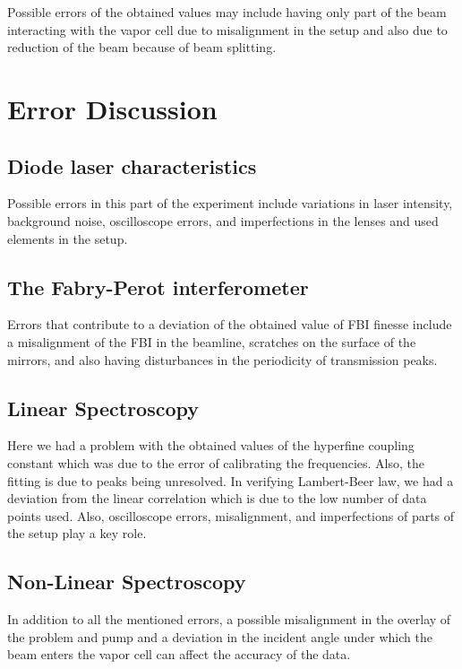 \documentclass[12pt]{article}
\begin{document}

Possible errors of the obtained values may include having only part of the beam interacting with the vapor cell due to misalignment in the setup and also due to reduction of the beam because of beam splitting.

\section{Error Discussion}

\subsection{Diode laser characteristics}
Possible errors in this part of the experiment include variations in laser intensity, background noise, oscilloscope errors, and imperfections in the lenses and used elements in the setup. 

\subsection{The Fabry-Perot interferometer}
Errors that contribute to a deviation of the obtained value of FBI finesse include a misalignment of the FBI in the beamline, scratches on the surface of the mirrors, and also having disturbances in the periodicity of transmission peaks. 

\subsection{Linear Spectroscopy}
Here we had a problem with the obtained values of the hyperfine coupling constant which was due to the error of calibrating the frequencies. Also, the fitting is due to peaks being unresolved. In verifying Lambert-Beer law, we had a deviation from the linear correlation which is due to the low number of data points used. Also, oscilloscope errors, misalignment, and imperfections of parts of the setup play a key role. 

\subsection{Non-Linear Spectroscopy}
In addition to all the mentioned errors, a possible misalignment in the overlay of the problem and pump and a deviation in the incident angle under which the beam enters the vapor cell can affect the accuracy of the data. 
\end{document}
